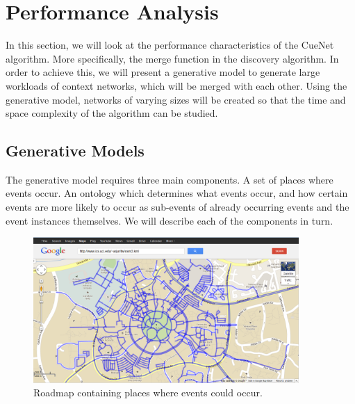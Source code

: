 
\section{Performance Analysis}
In this section, we will look at the performance characteristics of the CueNet algorithm. More specifically, the merge function in the discovery algorithm. In order to achieve this, we will present a generative model to generate large workloads of context networks, which will be merged with each other. Using the generative model, networks of varying sizes will be created so that the time and space complexity of the algorithm can be studied.

\subsection{Generative Models}
\label{section:generative_models}
The generative model requires three main components. A set of places where events occur. An ontology which determines what events occur, and how certain events are more likely to occur as sub-events of already occurring events and the event instances themselves. We will describe each of the components in turn. 


\begin{figure}[t]
\centering
\includegraphics[width=0.9\textwidth]{media/chapter5/perf/map-locations.png}
\caption{Roadmap containing places where events could occur.}
\label{fig:osm-roadmap-uci}
\end{figure}

